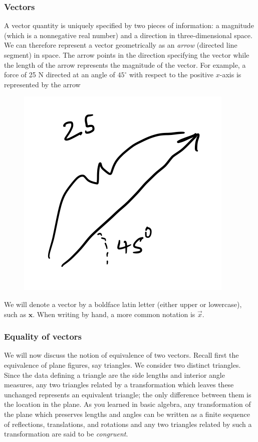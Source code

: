 \documentclass[12pt,letterpaper,reqno]{article}
\numberwithin{equation}{section}
\begin{document}
\subsubsection{Vectors}
A vector quantity is uniquely specified by two pieces of information: a magnitude (which is a nonnegative real number) and a direction in three-dimensional space. We can therefore represent a vector geometrically as an \emph{arrow} (directed line segment) in space.  The arrow points in the direction specifying the vector while the length of the arrow represents the magnitude of the vector. For example, a force of 25 N directed at an angle of $45^\circ$ with respect to the positive $x$-axis is represented by the arrow 
\begin{figure}[h]
\begin{center}
	\includegraphics[scale=0.5]{figures_mvc/1stvector}
\end{center}
\end{figure}


 We will denote a vector by a boldface latin letter (either upper or lowercase), such as $\mathbf{x}$. When writing by hand, a more common notation is $\vec{x}$.

\subsubsection{Equality of vectors}
We will now discuss the notion of equivalence of two vectors. Recall first the equivalence of plane figures, say triangles. We consider two distinct triangles. Since the data defining a triangle are the side lengths and interior angle measures, any two triangles related by a transformation which leaves these unchanged represents an equivalent triangle; the only difference between them is the location in the plane. As you learned in basic algebra, any transformation of the plane which preserves lengths and angles can be written as a finite sequence of reflections, translations, and rotations and any two triangles related by such a transformation are said to be \emph{congruent}. 
\end{document}
